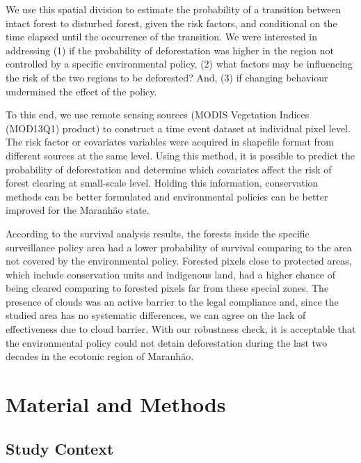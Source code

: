 We use this spatial division to estimate the probability of a transition between intact forest to disturbed forest, given the risk factors, and conditional on the time elapsed until the occurrence of the transition. We were interested in addressing (1) if the probability of deforestation was higher in the region not controlled by a specific environmental policy, (2) what factors may be influencing the risk of the two regions to be deforested? And, (3) if changing behaviour undermined the effect of the policy.

To this end, we use remote sensing sources (MODIS Vegetation Indices (MOD13Q1) product) to construct a time event dataset at individual pixel level. The risk factor or covariates variables were acquired in shapefile format from different sources at the same level. Using this method, it is possible to predict the probability of deforestation and determine which covariates affect the risk of forest clearing at small-scale level. Holding this information, conservation methods can be better formulated and environmental policies can be better improved for the Maranhão state.

According to the survival analysis results, the forests inside the specific surveillance policy area had a lower probability of survival comparing to the area not covered by the environmental policy. Forested pixels close to protected areas,  which include conservation units and indigenous land, had a higher chance of being cleared comparing to forested pixels far from these special zones. The presence of clouds was an active barrier to the legal compliance and, since the studied area has no systematic differences, we can agree on the lack of effectiveness due to cloud barrier. With our robustness check, it is acceptable that the environmental policy could not detain deforestation during the last two decades in the ecotonic region of Maranhão.


\section{Material and Methods}
\label{S:2}


\subsection{Study Context} %


